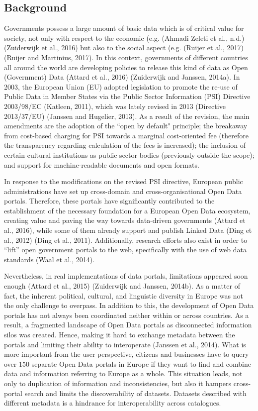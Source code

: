 \documentclass[<options>]{elsarticle}
\begin{document}
\subsection{Background}

Governments possess a large amount of basic data which is of critical value for society, not only with respect to the economic (e.g. (Ahmadi Zeleti et al., n.d.) (Zuiderwijk et al., 2016) but also to the social aspect (e.g. (Ruijer et al., 2017) (Ruijer and Martinius, 2017). In this context, governments of different countries all around the world are developing policies to release this kind of data as Open (Government) Data (Attard et al., 2016) (Zuiderwijk and Janssen, 2014a). In 2003, the European Union (EU) adopted legislation to promote the re-use of Public Data in Member States via the Public Sector Information (PSI) Directive 2003/98/EC (Katleen, 2011), which was lately revised in 2013 (Directive 2013/37/EU) (Janssen and Hugelier, 2013). As a result of the revision, the main amendments are the adoption of the ``open by default" principle; the breakaway from cost-based charging for PSI towards a marginal cost-oriented fee (therefore the transparency regarding calculation of the fees is increased); the inclusion of certain cultural institutions as public sector bodies (previously outside the scope); and support for machine-readable documents and open formats.

In response to the modifications on the revised PSI directive, European public administrations have set up cross-domain and cross-organisational Open Data portals. Therefore, these portals have significantly contributed to the establishment of the necessary foundation for a European Open Data ecosystem, creating value and paving the way towards data-driven governments (Attard et al., 2016), while some of them already support and publish Linked Data (Ding et al., 2012) (Ding et al., 2011). Additionally, research efforts also exist in order to “lift” open government portals to the web, specifically with the use of web data standards (Waal et al., 2014).

Nevertheless, in real implementations of data portals, limitations appeared soon enough (Attard et al., 2015) (Zuiderwijk and Janssen, 2014b). As a matter of fact, the inherent political, cultural, and linguistic diversity in Europe was not the only challenge to overpass. In addition to this, the development of Open Data portals has not always been coordinated neither within or across countries. As a result, a fragmented landscape of Open Data portals as disconnected information silos was created. Hence, making it hard to exchange metadata between the portals and limiting their ability to interoperate (Janssen et al., 2014). What is more important from the user perspective, citizens and businesses have to query over 150 separate Open Data portals in Europe if they want to find and combine data and information referring to Europe as a whole. This situation leads, not only to duplication of information and inconsistencies, but also it hampers cross-portal search and limits the discoverability of datasets. Datasets described with different metadata is a hindrance for interoperability across catalogues.
\end{document}
